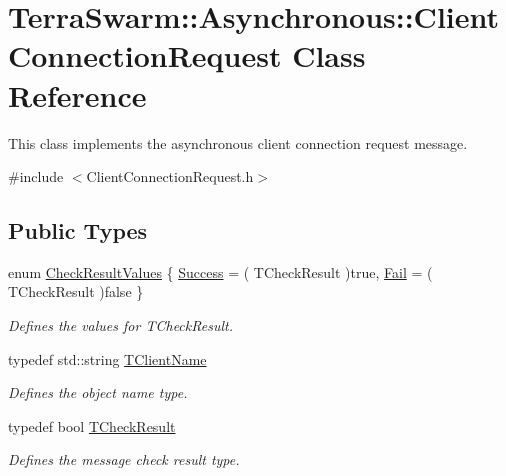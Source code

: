 \hypertarget{class_terra_swarm_1_1_asynchronous_1_1_client_connection_request}{\section{Terra\-Swarm\-:\-:Asynchronous\-:\-:Client\-Connection\-Request Class Reference}
\label{class_terra_swarm_1_1_asynchronous_1_1_client_connection_request}
}


This class implements the asynchronous client connection request message.  




{\ttfamily \#include $<$Client\-Connection\-Request.\-h$>$}

\subsection*{Public Types}
\begin{DoxyCompactItemize}
\item 
enum \hyperlink{class_terra_swarm_1_1_asynchronous_1_1_client_connection_request_a4bf8bd6c59ce06a2866216fa2d475486}{Check\-Result\-Values} \{ \hyperlink{class_terra_swarm_1_1_asynchronous_1_1_client_connection_request_a4bf8bd6c59ce06a2866216fa2d475486a2bc78a5f6820084d63ec2155279020f5}{Success} = ( T\-Check\-Result )true, 
\hyperlink{class_terra_swarm_1_1_asynchronous_1_1_client_connection_request_a4bf8bd6c59ce06a2866216fa2d475486a7fc097e234db70697be97d0975d6a1d6}{Fail} = ( T\-Check\-Result )false
 \}
\begin{DoxyCompactList}\small\item\em Defines the values for T\-Check\-Result. \end{DoxyCompactList}\item 
typedef std\-::string \hyperlink{class_terra_swarm_1_1_asynchronous_1_1_client_connection_request_a50a16fcfef8eb10d5191b6eaf0723a92}{T\-Client\-Name}
\begin{DoxyCompactList}\small\item\em Defines the object name type. \end{DoxyCompactList}\item 
typedef bool \hyperlink{class_terra_swarm_1_1_asynchronous_1_1_client_connection_request_a5c46a6a486f1f74b413e11b919b44d4f}{T\-Check\-Result}
\begin{DoxyCompactList}\small\item\em Defines the message check result type. \end{DoxyCompactList}\end{DoxyCompactItemize}
